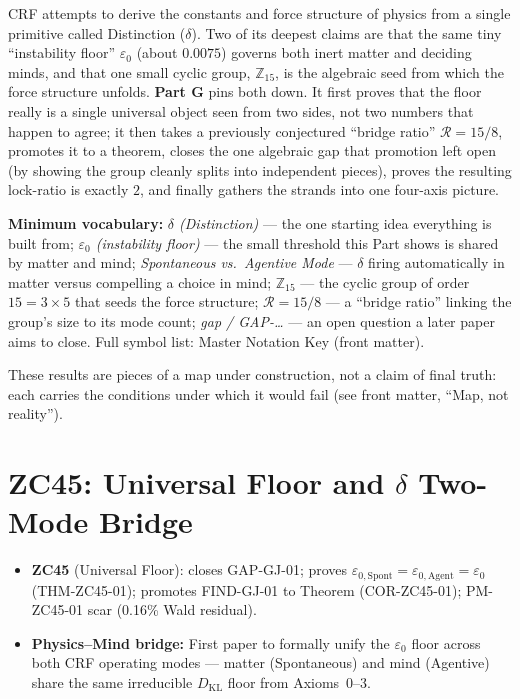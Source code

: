 \documentclass[12pt, a4paper]{article}
\begin{document}
\begin{keybox}[title={If you are just arriving --- Part G in plain language}]
\sloppy
CRF attempts to derive the constants and force structure of physics from a
single primitive called Distinction ($\delta$). Two of its deepest claims are
that the same tiny ``instability floor'' $\varepsilon_0$ (about $0.0075$)
governs both inert matter and deciding minds, and that one small cyclic group,
$\mathbb{Z}_{15}$, is the algebraic seed from which the force structure unfolds.
\textbf{Part G} pins both down. It first proves that the floor really is a
single universal object seen from two sides, not two numbers that happen to
agree; it then takes a previously conjectured ``bridge ratio'' $\mathcal{R}=15/8$,
promotes it to a theorem, closes the one algebraic gap that promotion left open
(by showing the group cleanly splits into independent pieces), proves the
resulting lock-ratio is exactly $2$, and finally gathers the strands into one
four-axis picture.

\textbf{Minimum vocabulary:}
\textit{$\delta$ (Distinction)} --- the one starting idea everything is built
from;\;
\textit{$\varepsilon_0$ (instability floor)} --- the small threshold this Part
shows is shared by matter and mind;\;
\textit{Spontaneous vs.\ Agentive Mode} --- $\delta$ firing automatically in
matter versus compelling a choice in mind;\;
\textit{$\mathbb{Z}_{15}$} --- the cyclic group of order $15=3\times5$ that
seeds the force structure;\;
\textit{$\mathcal{R}=15/8$} --- a ``bridge ratio'' linking the group's size to
its mode count;\;
\textit{gap / GAP-\dots} --- an open question a later paper aims to close.
Full symbol list: Master Notation Key (front matter).

These results are pieces of a map under construction, not a claim of final
truth: each carries the conditions under which it would fail (see front
matter, ``Map, not reality'').
\end{keybox}

\clearpage

\part{ZC45: Universal Floor and $\delta$ Two-Mode Bridge}
\label{part:xxxv}

\begin{keybox}[title={Part XXXV Overview}]
\begin{itemize}[leftmargin=1.5em]
\item \textbf{ZC45} (Universal Floor): closes GAP-GJ-01;
  proves $\varepsilon_{0,\mathrm{Spont}} = \varepsilon_{0,\mathrm{Agent}}
  = \varepsilon_0$ (THM-ZC45-01); promotes FIND-GJ-01 to Theorem
  (COR-ZC45-01); PM-ZC45-01 scar (0.16\% Wald residual).
\item \textbf{Physics--Mind bridge:} First paper to formally unify
  the $\varepsilon_0$ floor across both CRF operating modes ---
  matter (Spontaneous) and mind (Agentive) share the same irreducible
  $D_{\mathrm{KL}}$ floor from Axioms~0--3.
\end{itemize}
\end{keybox}
\end{document}
